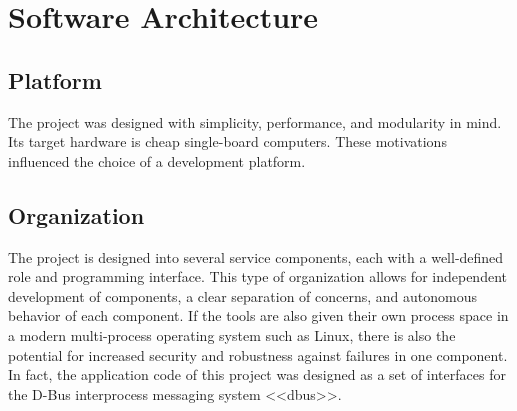 

\section{Software Architecture}

\subsection{Platform}

The project was designed with simplicity, performance, and modularity in mind.
Its target hardware is cheap single-board computers.
These motivations influenced the choice of a development platform.

\subsection{Organization}

The project is designed into several service components, each with a well-defined role and programming interface.
This type of organization allows for independent development of components, a clear separation of concerns, and autonomous behavior of each component.
If the tools are also given their own process space in a modern multi-process operating system such as Linux, there is also the potential for increased security and robustness against failures in one component.
In fact, the application code of this project was designed as a set of interfaces for the D-Bus interprocess messaging system <<dbus>>.


